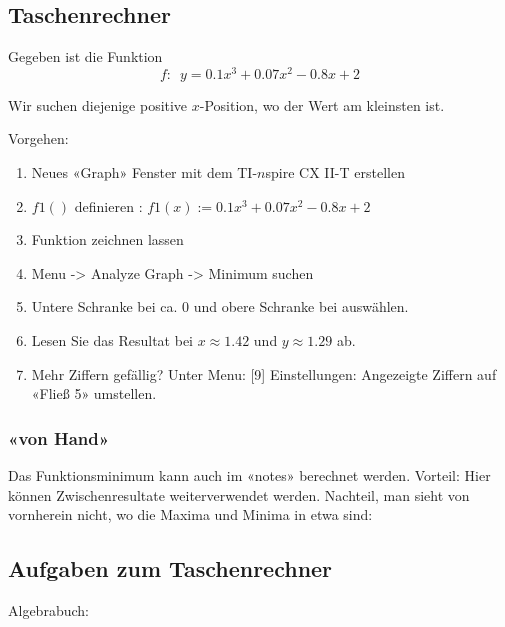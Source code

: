 \newpage


\subsection{Taschenrechner}
Gegeben ist die Funktion
$$f:\,\,\, y = 0.1 x^3 + 0.07 x^2 - 0.8 x + 2$$

Wir suchen diejenige positive $x$-Position, wo der Wert am kleinsten ist.

Vorgehen:
\begin{enumerate}
\item Neues «Graph» Fenster mit dem TI-$n$spire CX II-T erstellen
\item $f1()$ definieren : $f1(x) := 0.1 x^3 + 0.07 x^2 - 0.8 x + 2$
\item Funktion zeichnen lassen
\item Menu -> Analyze Graph -> Minimum suchen
\item Untere Schranke bei ca. 0 und obere Schranke bei  auswählen.
\item Lesen Sie das Resultat bei $x\approx 1.42$ und $y\approx 1.29$ ab.
  \item Mehr Ziffern gefällig? Unter Menu: [9] Einstellungen: Angezeigte Ziffern auf \zB «Fließ 5» umstellen.
\end{enumerate}


\subsubsection{«von Hand»}
Das Funktionsminimum kann auch im «notes» berechnet werden. Vorteil: Hier können Zwischenresultate weiterverwendet werden. Nachteil, man sieht von vornherein nicht, wo die Maxima und Minima in etwa sind:



\subsection*{Aufgaben zum Taschenrechner}

Algebrabuch:

